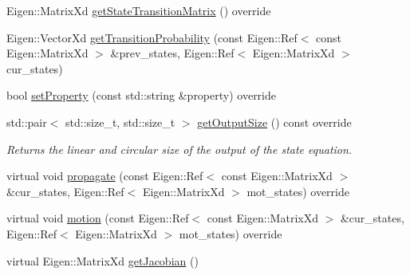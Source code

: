 \begin{DoxyCompactItemize}
\item 
Eigen\+::\+Matrix\+Xd \mbox{\hyperlink{classbfl_1_1WhiteNoiseAcceleration_aa304ad7f628e84c06393ba3835d2bb2f}{get\+State\+Transition\+Matrix}} () override
\item 
Eigen\+::\+Vector\+Xd \mbox{\hyperlink{classbfl_1_1WhiteNoiseAcceleration_a10d81273e59d14f7d7ce794533c122a8}{get\+Transition\+Probability}} (const Eigen\+::\+Ref$<$ const Eigen\+::\+Matrix\+Xd $>$ \&prev\+\_\+states, Eigen\+::\+Ref$<$ Eigen\+::\+Matrix\+Xd $>$ cur\+\_\+states)
\item 
bool \mbox{\hyperlink{classbfl_1_1WhiteNoiseAcceleration_a0203b47074e0680852f53dcba8a7a627}{set\+Property}} (const std\+::string \&property) override
\item 
std\+::pair$<$ std\+::size\+\_\+t, std\+::size\+\_\+t $>$ \mbox{\hyperlink{classbfl_1_1WhiteNoiseAcceleration_ac3e447bf2f520b543c67d066f72423b7}{get\+Output\+Size}} () const override
\begin{DoxyCompactList}\small\item\em Returns the linear and circular size of the output of the state equation. \end{DoxyCompactList}\item 
virtual void \mbox{\hyperlink{classbfl_1_1LinearStateModel_a7823383ddc1ed709b9399c712997f512}{propagate}} (const Eigen\+::\+Ref$<$ const Eigen\+::\+Matrix\+Xd $>$ \&cur\+\_\+states, Eigen\+::\+Ref$<$ Eigen\+::\+Matrix\+Xd $>$ mot\+\_\+states) override
\item 
virtual void \mbox{\hyperlink{classbfl_1_1AdditiveStateModel_a9f145bf8c592fc0092d84421f26dbb8b}{motion}} (const Eigen\+::\+Ref$<$ const Eigen\+::\+Matrix\+Xd $>$ \&cur\+\_\+states, Eigen\+::\+Ref$<$ Eigen\+::\+Matrix\+Xd $>$ mot\+\_\+states) override
\item 
virtual Eigen\+::\+Matrix\+Xd \mbox{\hyperlink{classbfl_1_1StateModel_a78df4b39578345142fcfb18abaab2177}{get\+Jacobian}} ()
\end{DoxyCompactItemize}
